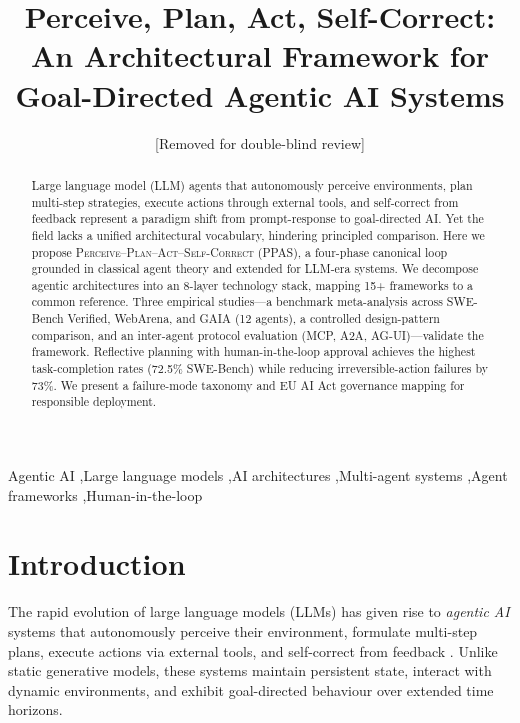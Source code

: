 \documentclass[review]{elsarticle}
\theoremstyle{definition}
\begin{document}
\linenumbers

\begin{frontmatter}

\title{Perceive, Plan, Act, Self-Correct: An Architectural Framework for Goal-Directed Agentic AI Systems}

\author{[Removed for double-blind review]}

\begin{abstract}
Large language model (LLM) agents that autonomously perceive environments, plan multi-step strategies, execute actions through external tools, and self-correct from feedback represent a paradigm shift from prompt-response to goal-directed AI. Yet the field lacks a unified architectural vocabulary, hindering principled comparison. Here we propose \textsc{Perceive--Plan--Act--Self-Correct} (PPAS), a four-phase canonical loop grounded in classical agent theory and extended for LLM-era systems. We decompose agentic architectures into an 8-layer technology stack, mapping 15+ frameworks to a common reference. Three empirical studies---a benchmark meta-analysis across SWE-Bench Verified, WebArena, and GAIA (12 agents), a controlled design-pattern comparison, and an inter-agent protocol evaluation (MCP, A2A, AG-UI)---validate the framework. Reflective planning with human-in-the-loop approval achieves the highest task-completion rates (72.5\% SWE-Bench) while reducing irreversible-action failures by 73\%. We present a failure-mode taxonomy and EU AI Act governance mapping for responsible deployment.
\end{abstract}

\begin{keyword}
Agentic AI \sep Large language models \sep AI architectures \sep Multi-agent systems \sep Agent frameworks \sep Human-in-the-loop
\end{keyword}

\end{frontmatter}

\section{Introduction}\label{sec:introduction}

The rapid evolution of large language models (LLMs) has given rise to \emph{agentic AI} systems that autonomously perceive their environment, formulate multi-step plans, execute actions via external tools, and self-correct from feedback \citep{yao2023react,shinn2023reflexion,wang2024survey}. Unlike static generative models, these systems maintain persistent state, interact with dynamic environments, and exhibit goal-directed behaviour over extended time horizons.
\end{document}
